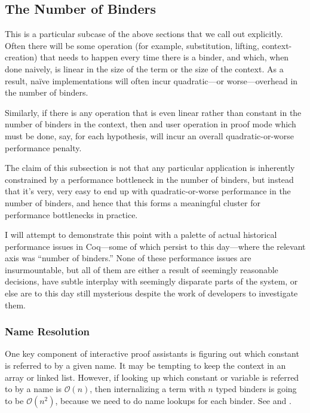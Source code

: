 \subsection{The Number of Binders} \label{sec:perf:binder-count}

This is a particular subcase of the above sections that we call out explicitly.
Often there will be some operation (for example, substitution, lifting, context-creation) that needs to happen every time there is a binder, and which, when done naively, is linear in the size of the term or the size of the context.
As a result, na\"ive implementations will often incur quadratic---or worse---overhead in the number of binders.


Similarly, if there is any operation that is even linear rather than constant in the number of binders in the context, then and user operation in proof mode which must be done, say, for each hypothesis, will incur an overall quadratic-or-worse performance penalty.

The claim of this subsection is not that any particular application is inherently constrained by a performance bottleneck in the number of binders, but instead that it's very, very easy to end up with quadratic-or-worse performance in the number of binders, and hence that this forms a meaningful cluster for performance bottlenecks in practice.

I will attempt to demonstrate this point with a palette of actual historical performance issues in Coq---some of which persist to this day---where the relevant axis was ``number of binders.''
None of these performance issues are insurmountable, but all of them are either a result of seemingly reasonable decisions, have subtle interplay with seemingly disparate parts of the system, or else are to this day still mysterious despite the work of developers to investigate them.

\subsubsection{Name Resolution} \label{sec:name-resolution}
One key component of interactive proof assistants is figuring out which constant is referred to by a given name.
It may be tempting to keep the context in an array or linked list.
However, if looking up which constant or variable is referred to by a name is $\mathcal O(n)$, then internalizing a term with $n$ typed binders is going to be $\mathcal O(n^2)$, because we need to do name lookups for each binder.
See  and .

